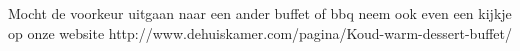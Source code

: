 Mocht de voorkeur uitgaan naar een ander buffet of bbq neem ook even een kijkje op onze website http://www.dehuiskamer.com/pagina/Koud-warm-dessert-buffet/ 
